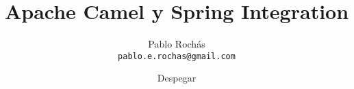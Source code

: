 \documentclass{beamer}
\title{Apache Camel y Spring Integration}
\author[prochas]{Pablo Rochás\\ \texttt{pablo.e.rochas@gmail.com}}
\date[Despegar]{Despegar}
\begin{document}
\begin{frame}
\titlepage
\end{frame}
\end{document}
